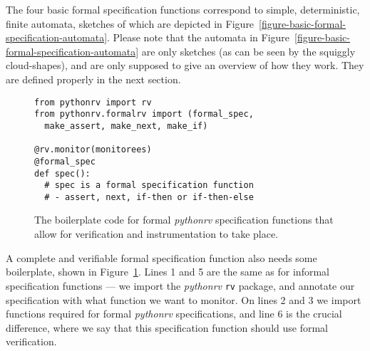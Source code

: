 The four basic formal specification functions correspond to simple,
deterministic, finite automata, sketches of which are depicted in
Figure~\ref{figure-basic-formal-specification-automata}. Please note that the
automata in Figure~\ref{figure-basic-formal-specification-automata} are only
sketches (as can be seen by the squiggly cloud-shapes), and are only supposed
to give an overview of how they work. They are defined properly in the next
section.

\begin{figure}[h!]
	\begin{center}
	\begin{minipage}{0.7\textwidth}
	\begin{lstlisting}
from pythonrv import rv
from pythonrv.formalrv import (formal_spec,
  make_assert, make_next, make_if)

@rv.monitor(monitorees)
@formal_spec
def spec():
  # spec is a formal specification function
  # - assert, next, if-then or if-then-else
	\end{lstlisting}
	\end{minipage}
	\end{center}

  \caption{The boilerplate code for formal \textit{pythonrv} specification
  functions that allow for verification and instrumentation to take place.}
	\label{figure-formal-boilerplate}
\end{figure}

A complete and verifiable formal specification function also needs some
boilerplate, shown in Figure~\ref{figure-formal-boilerplate}. Lines 1 and 5 are
the same as for informal specification functions --- we import the
\textit{pythonrv} \texttt{rv} package, and annotate our specification with what
function we want to monitor. On lines 2 and 3 we import functions required for
formal \textit{pythonrv} specifications, and line 6 is the crucial difference,
where we say that this specification function should use formal verification.


